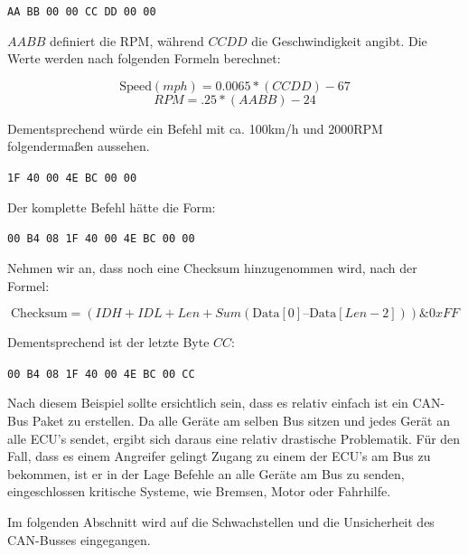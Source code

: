 \documentclass[
    fontsize=12pt,
    headings=small,
    parskip=half,           %
    bibliography=totoc,9
    numbers=noenddot,       %
    open=any,               %
    ]{scrreprt}
\begin{document}
\centerline{\texttt{AA BB 00 00 CC DD 00 00}}

$AA BB$ definiert die RPM, während $CC DD$ die Geschwindigkeit angibt. Die Werte werden nach folgenden Formeln berechnet:

\[\text{Speed} (mph) = 0.0065 * (CC DD) - 67\]
\[RPM = .25 * (AA BB) - 24\]

Dementsprechend würde ein Befehl mit ca. 100km/h und 2000RPM folgendermaßen aussehen.

\centerline{\texttt{1F 40 00 4E BC 00 00}}

Der komplette Befehl hätte die Form:

\centerline{\texttt{00 B4 08 1F 40 00 4E BC 00 00}}

Nehmen wir an, dass noch eine Checksum hinzugenommen wird, nach der Formel:

\[\text{Checksum} = (IDH + IDL + Len + Sum(\text{Data}[0] – \text{Data}[Len-2])) \& 0xFF \]

Dementsprechend ist der letzte Byte $CC$:

\centerline{\texttt{00 B4 08 1F 40 00 4E BC 00 CC}}

Nach diesem Beispiel sollte ersichtlich sein, dass es relativ einfach ist ein CAN-Bus Paket zu erstellen.
Da alle Geräte am selben Bus sitzen und jedes Gerät an alle ECU's sendet, ergibt sich daraus eine relativ drastische Problematik.
Für den Fall, dass es einem Angreifer gelingt Zugang zu einem der ECU's am Bus zu bekommen, ist er in der Lage Befehle an alle Geräte am Bus zu senden, eingeschlossen kritische Systeme, wie Bremsen, Motor oder Fahrhilfe.

Im folgenden Abschnitt wird auf die Schwachstellen und die Unsicherheit des CAN-Busses eingegangen.
\end{document}
